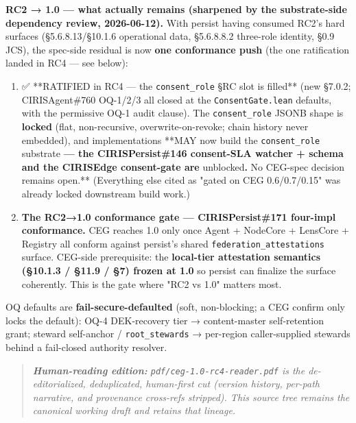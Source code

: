 \documentclass[10pt]{article}
\begin{document}
\textbf{RC2 → 1.0 — what actually remains (sharpened by the substrate-side dependency review, 2026-06-12).} With persist having consumed RC2's hard surfaces (§5.6.8.13/§10.1.6 operational data, §5.6.8.8.2 three-role identity, §0.9 JCS), the spec-side residual is now \textbf{one conformance push} (the one ratification landed in RC4 — see below):

\begin{enumerate}\setlength\itemsep{0pt}
\item ✅ **RATIFIED in RC4 — the \texttt{consent\_role} §RC slot is filled** (new §7.0.2; CIRISAgent\#760 OQ-1/2/3 all closed at the \texttt{ConsentGate.lean} defaults, with the permissive OQ-1 audit clause). The \texttt{consent\_role} JSONB shape is \textbf{locked} (flat, non-recursive, overwrite-on-revoke; chain history never embedded), and implementations **MAY now build the \texttt{consent\_role} substrate\textbf{ — the CIRISPersist\#146 consent-SLA watcher + schema and the CIRISEdge consent-gate are }unblocked\textbf{. }No CEG-spec decision remains open.** (Everything else cited as "gated on CEG 0.6/0.7/0.15" was already locked downstream build work.)
\item \textbf{The RC2→1.0 conformance gate — CIRISPersist\#171 four-impl conformance.} CEG reaches 1.0 only once Agent + NodeCore + LensCore + Registry all conform against persist's shared \texttt{federation\_attestations} surface. CEG-side prerequisite: the \textbf{local-tier attestation semantics (§10.1.3 / §11.9 / §7) frozen at 1.0} so persist can finalize the surface coherently. This is the gate where "RC2 vs 1.0" matters most.
\end{enumerate}


OQ defaults are \textbf{fail-secure-defaulted} (soft, non-blocking; a CEG confirm only locks the default): OQ-4 DEK-recovery tier → content-master self-retention grant; steward self-anchor / \texttt{root\_stewards} → per-region caller-supplied stewards behind a fail-closed authority resolver.


\begin{quote}\itshape \textbf{Human-reading edition:} \texttt{pdf/ceg-1.0-rc4-reader.pdf} is the de-editorialized, deduplicated, human-first cut (version history, per-path narrative, and provenance cross-refs stripped). This source tree remains the canonical working draft and retains that lineage.\end{quote}
\end{document}
